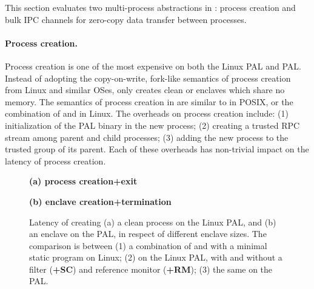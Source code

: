 \label{sec:eval:pal:multi-proc}

This section evaluates two multi-process abstractions in \thehostabi:
process creation and bulk IPC channels for zero-copy data transfer between processes.



\paragraph{Process creation.}
Process creation is one of the most expensive
\hostapis{} on both the Linux PAL and \sgx{} PAL.
Instead of adopting the copy-on-write, fork-like semantics
of process creation
from Linux and similar OSes,
\thehostabi{}
only creates clean \picoprocs{} or enclaves
which share no memory.
The semantics of process creation
in \thehostabi{}
are similar to  in POSIX, or the combination
of  and  in Linux.
The overheads on process creation
include:
(1) initialization of the PAL binary in the new process;
(2) creating a trusted RPC stream among parent and child processes;
(3) adding the new process to the trusted group of its parent.
Each of these overheads
has non-trivial impact on
the latency of process creation.







\begin{figure*}[t!]
\centering
\footnotesize
{}
\parbox{0.59\textwidth}{\centering\bf (a) process creation+exit}
\parbox{0.39\textwidth}{\centering\bf (b) \sgx{} enclave creation+termination}
\caption{Latency of creating (a) a clean process on the Linux PAL, and (b) an enclave on the \sgx{} PAL, in respect of different enclave sizes.
The comparison is between (1) a combination of  and  with a minimal static program on Linux; (2)  on the Linux PAL, with and without a \seccomp{} filter ({\bf +SC}) and reference monitor ({\bf +RM}); (3) the same \hostapi{} on the \sgx{} PAL.}
\label{fig:eval:pal:proc-latency}
\end{figure*}


